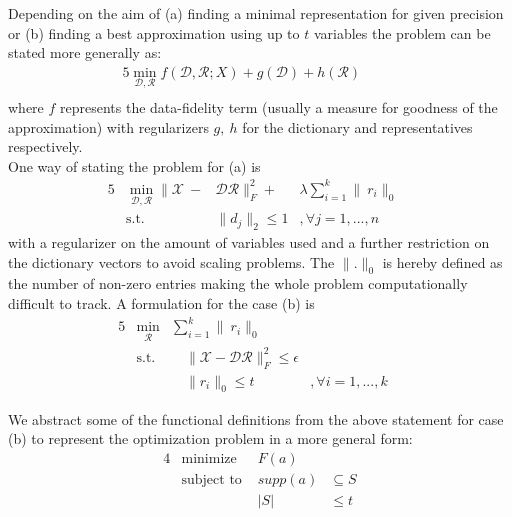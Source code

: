 \documentclass{article}
\newcommand{\R}{\mathbb{R}}
\DeclareMathOperator*{\argmin}{\arg\!\min}
\begin{document}
\noindent Depending on the aim of (a) finding a minimal representation for given precision or (b) finding a best approximation using up to $t$ variables the problem can be stated more generally as:
\begin{alignat*}{5}
          \min_{\mathcal{D}, \mathcal{R}}  f(\mathcal{D}, \mathcal{R}; X) + g(\mathcal{D}) + h(\mathcal{R})      & \quad  & \\
\end{alignat*}
where $f$ represents the data-fidelity term (usually a measure for goodness of the approximation) with regularizers $g,\ h$ for the dictionary and representatives respectively.
\\
One way of stating the problem for (a) is
\begin{alignat}{5}
         & \min_{\mathcal{D}, \mathcal{R}} \|\mathcal{X} \ -&\mathcal{D}\mathcal{R}\|_F^2  + &\lambda \sum_{i=1}^k  \|\ r_i\|_0     \quad   \\
         &\text{s.t.}  \quad  &\|d_j\|_2 \leq 1&, \forall j=1, ...,n  \quad 
\end{alignat}
with a regularizer on the amount of variables used and a further restriction on the dictionary vectors to avoid scaling problems. The $\| .\|_0$ is hereby defined as the number of non-zero entries making the whole problem computationally difficult to track\cite{NPHardproof}. A formulation for the case (b) is 
\begin{alignat}{5}
          &\min_{\mathcal{R}} &\sum_{i=1}^k  \|\ r_i\|_0     \quad  & \\
         &\text{s.t.}  &\quad  \|\mathcal{X}-\mathcal{D}\mathcal{R}\|_F^2 \leq \epsilon & \quad \\
          & \ & \quad  \| r_i \|_0 \leq t  &, \forall i=1, ..., k  \quad 
\end{alignat}


\noindent We abstract some of the functional definitions from the above statement for case (b) to represent the optimization problem in a more general form:
\begin{alignat*}{4}
    &\text{minimize }   & F(a) & \\
    &\text{subject to } & \textit{supp}(a)&\subseteq S\\
    &                   & |S|  &\leq t\\
\end{alignat*}
\end{document}
